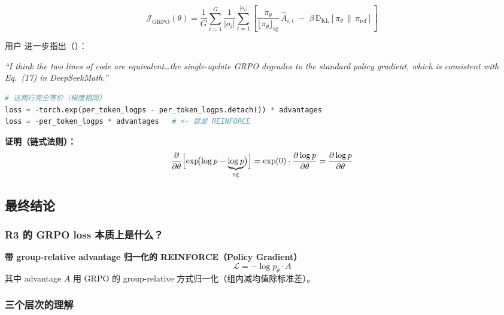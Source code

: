 \[
    \mathcal{J}_{\mathrm{GRPO}}(\theta)
    = \frac{1}{G} \sum_{i=1}^{G} \frac{1}{|o_i|} \sum_{t=1}^{|o_i|}
      \left[
          \frac{\pi_\theta}{\lfloor \pi_\theta \rfloor_{\mathrm{sg}}} \,\hat{A}_{i,t}
          \;-\;
          \beta\, \mathbb{D}_{\mathrm{KL}}\!\left[\pi_\theta \,\|\, \pi_{\mathrm{ref}}\right]
      \right]
\]

用户  进一步指出（）：

\begin{summarybox}
\textit{``I think the two lines of code are equivalent\ldots the single-update GRPO
degrades to the standard policy gradient, which is consistent with Eq.~(17) in
DeepSeekMath.''}

\medskip
\begin{lstlisting}[language=Python]
# 这两行完全等价（梯度相同）
loss = -torch.exp(per_token_logps - per_token_logps.detach()) * advantages
loss = -per_token_logps * advantages   # <- 就是 REINFORCE
\end{lstlisting}

\medskip
\textbf{证明（链式法则）：}
\[
    \frac{\partial}{\partial\theta}
    \Bigl[\exp\!\bigl(\log p - \underbrace{\log p}_{\mathrm{sg}}\bigr)\Bigr]
    = \exp(0) \cdot \frac{\partial \log p}{\partial \theta}
    = \frac{\partial \log p}{\partial \theta}
\]
\end{summarybox}

\subsection{最终结论}

\subsubsection{R3 的 GRPO loss 本质上是什么？}

\begin{summarybox}
\textbf{带 group-relative advantage 归一化的 REINFORCE（Policy Gradient）}
\[
    \mathcal{L} = -\log p_\theta \cdot A
\]
其中 advantage $A$ 用 GRPO 的 group-relative 方式归一化（组内减均值除标准差）。
\end{summarybox}

\subsubsection{三个层次的理解}

